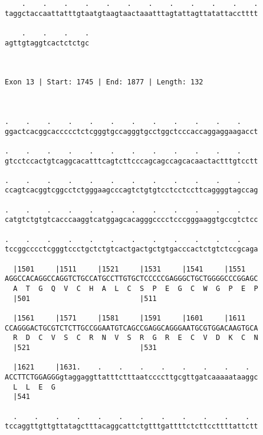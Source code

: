 \documentclass{article}
\begin{document}
\begin{Verbatim}
    .    .    .    .    .    .    .    .    .    .    .    .
taggctaccaattatttgtaatgtaagtaactaaatttagtattagttatattacctttt
                                                            
    .    .    .    .
agttgtaggtcactctctgc
                    
                    
 
Exon 13 | Start: 1745 | End: 1877 | Length: 132



.    .    .    .    .    .    .    .    .    .    .    .    
ggactcacggcaccccctctcgggtgccagggtgcctggctcccaccaggaggaagacct
                                                            
.    .    .    .    .    .    .    .    .    .    .    .    
gtcctccactgtcaggcacatttcagtcttcccagcagccagcacaactactttgtcctt
                                                            
.    .    .    .    .    .    .    .    .    .    .    .    
ccagtcacggtcggcctctgggaagcccagtctgtgtcctcctccttcaggggtagccag
                                                            
.    .    .    .    .    .    .    .    .    .    .    .    
catgtctgtgtcacccaaggtcatggagcacagggcccctcccgggaaggtgccgtctcc
                                                            
.    .    .    .    .    .    .    .    .    .    .    .    
tccggcccctcgggtccctgctctgtcactgactgctgtgacccactctgtctccgcaga
                                                            
  |1501     |1511     |1521     |1531     |1541     |1551   
AGGCCACAGGCCAGGTCTGCCATGCCTTGTGCTCCCCCGAGGGCTGCTGGGGCCCGGAGC
  A  T  G  Q  V  C  H  A  L  C  S  P  E  G  C  W  G  P  E  P
  |501                          |511                        
  
  |1561     |1571     |1581     |1591     |1601     |1611   
CCAGGGACTGCGTCTCTTGCCGGAATGTCAGCCGAGGCAGGGAATGCGTGGACAAGTGCA
  R  D  C  V  S  C  R  N  V  S  R  G  R  E  C  V  D  K  C  N
  |521                          |531                        
  
  |1621     |1631.    .    .    .    .    .    .    .    .  
ACCTTCTGGAGGGgtaggaggttatttctttaatccccttgcgttgatcaaaaataaggc
  L  L  E  G                                                
  |541                                                      
  
  .    .    .    .    .    .    .    .    .    .    .    .  
tccaggttgttgttatagctttacaggcattctgtttgattttctcttccttttattctt
                                                            

\end{Verbatim}
\end{document}

